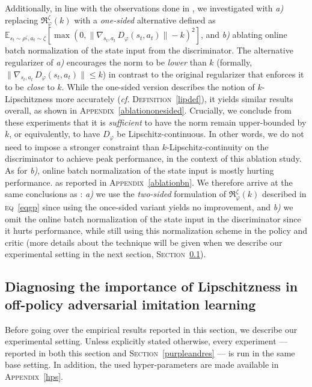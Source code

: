 Additionally, in line with the observations done in \cite{Gulrajani2017-mr},
we investigated with
\textit{a)} replacing $\mathfrak{R}_\varphi^\zeta (k)$ with a \emph{one-sided} alternative
defined as $\mathbb{E}_{s_t \sim \rho^{\zeta}, a_t \sim \zeta}
[\max(0, \lVert  \nabla _{s_t,a_t} \, D_\varphi(s_t,a_t) \rVert - k )^2]$, and
\textit{b)} ablating online batch normalization of the state input from the discriminator.
The alternative regularizer of \textit{a)} encourages the norm to be \emph{lower} than $k$
(formally, $\lVert \nabla _{s_t,a_t} \, D_\varphi(s_t,a_t) \rVert \leq k$)
in contrast to the original regularizer that enforces it to be \emph{close} to $k$.
While the one-sided version describes the notion of $k$-Lipschitzness more accurately
(\textit{cf.} \textsc{Definition}~\ref{lipdef}),
it yields similar results overall,
as shown in \textsc{Appendix}~\ref{ablationonesided}.
Crucially, we conclude from these experiments that it is \emph{sufficient} to have
the norm remain upper-bounded by $k$, or equivalently, to have $D_\varphi$ be Lipschitz-continuous.
In other words, we do not need to impose a stronger constraint
than $k$-Lipschitz-continuity
on the discriminator to achieve peak performance,
in the context of this ablation study.
As for \textit{b)}, online batch normalization of the state input is mostly hurting performance.
as reported in \textsc{Appendix}~\ref{ablationbn}.
We therefore arrive at the same conclusions as \cite{Gulrajani2017-mr}:
\textit{a)} we use the \textit{two-sided} formulation of $\mathfrak{R}_\varphi^\zeta (k)$ described in
\textsc{eq}~\ref{eqgp} since using the once-sided variant yields no improvement,
and \textit{b)} we omit the online batch normalization of the state input in the
discriminator since it hurts performance, while still using this normalization scheme in
the policy and critic (more details about the technique will be given when we describe our
experimental setting in the next section, \textsc{Section}~\ref{empres1}).

\subsection[%
Diagnosing the importance of Lipschitzness
in off-policy adversarial IL]{%
Diagnosing the importance of Lipschitzness
in off-policy adversarial imitation learning}
\label{empres1}

Before going over the empirical results reported in this section,
we describe our experimental setting.
Unless explicitly stated otherwise,
every experiment --- reported in both this section and \textsc{Section}~\ref{purpleandres} ---
is run in the same base setting.
In addition, the used hyper-parameters are made available in
\textsc{Appendix}~\ref{hps}.

